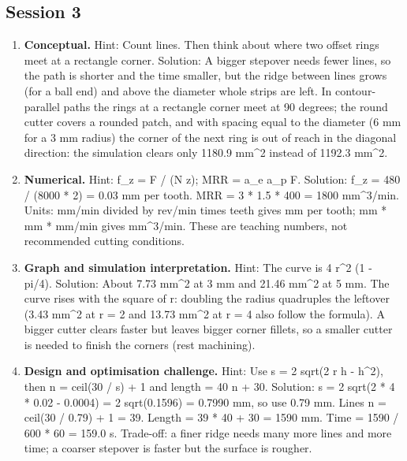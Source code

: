 \documentclass[11pt,a4paper]{article}
\begin{document}
\subsection*{Session 3}
\begin{enumerate}[nosep]
\item \textbf{Conceptual.} Hint: Count lines. Then think about where two offset rings meet at a rectangle corner. Solution: A bigger stepover needs fewer lines, so the path is shorter and the time smaller, but the ridge between lines grows (for a ball end) and above the diameter whole strips are left. In contour-parallel paths the rings at a rectangle corner meet at 90 degrees; the round cutter covers a rounded patch, and with spacing equal to the diameter (6 mm for a 3 mm radius) the corner of the next ring is out of reach in the diagonal direction: the simulation clears only 1180.9 mm\textasciicircum{}2 instead of 1192.3 mm\textasciicircum{}2.
\item \textbf{Numerical.} Hint: f\_z = F / (N z); MRR = a\_e a\_p F. Solution: f\_z = 480 / (8000 * 2) = 0.03 mm per tooth. MRR = 3 * 1.5 * 400 = 1800 mm\textasciicircum{}3/min. Units: mm/min divided by rev/min times teeth gives mm per tooth; mm * mm * mm/min gives mm\textasciicircum{}3/min. These are teaching numbers, not recommended cutting conditions.
\item \textbf{Graph and simulation interpretation.} Hint: The curve is 4 r\textasciicircum{}2 (1 - pi/4). Solution: About 7.73 mm\textasciicircum{}2 at 3 mm and 21.46 mm\textasciicircum{}2 at 5 mm. The curve rises with the square of r: doubling the radius quadruples the leftover (3.43 mm\textasciicircum{}2 at r = 2 and 13.73 mm\textasciicircum{}2 at r = 4 also follow the formula). A bigger cutter clears faster but leaves bigger corner fillets, so a smaller cutter is needed to finish the corners (rest machining).
\item \textbf{Design and optimisation challenge.} Hint: Use s = 2 sqrt(2 r h - h\textasciicircum{}2), then n = ceil(30 / s) + 1 and length = 40 n + 30. Solution: s = 2 sqrt(2 * 4 * 0.02 - 0.0004) = 2 sqrt(0.1596) = 0.7990 mm, so use 0.79 mm. Lines n = ceil(30 / 0.79) + 1 = 39. Length = 39 * 40 + 30 = 1590 mm. Time = 1590 / 600 * 60 = 159.0 s. Trade-off: a finer ridge needs many more lines and more time; a coarser stepover is faster but the surface is rougher.
\end{enumerate}
\end{document}
